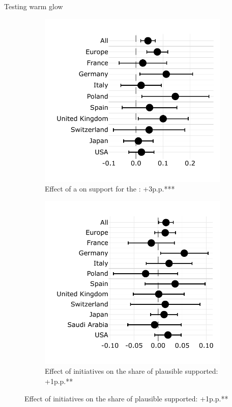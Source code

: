 \documentclass[aspectratio=169,xcolor=dvipsnames, 11pt,mathserif]{beamer}
\begin{document}
\begin{frame}{Testing warm glow\label{warm_glow}} 
    \begin{figure}
\begin{subfigure}{.47\textwidth}
  \caption[]{Effect of a  on support for the : +3p.p.*** \quad {}}
  \includegraphics[width=\textwidth]{../figures/country_comparison/gcs_support_by_variant_warm_glow.pdf}
\end{subfigure} \quad \pause
\begin{subfigure}{.47\textwidth}
  \caption[]{Effect of  initiatives on the share of plausible  supported: +1p.p.** \quad {} \hyperlink{2SLS}{}}
  \includegraphics[width=\textwidth]{../figures/country_comparison/share_solidarity_supported_by_info_solidarity.pdf}

\end{subfigure}
\end{figure}
\end{frame}
\end{document}
